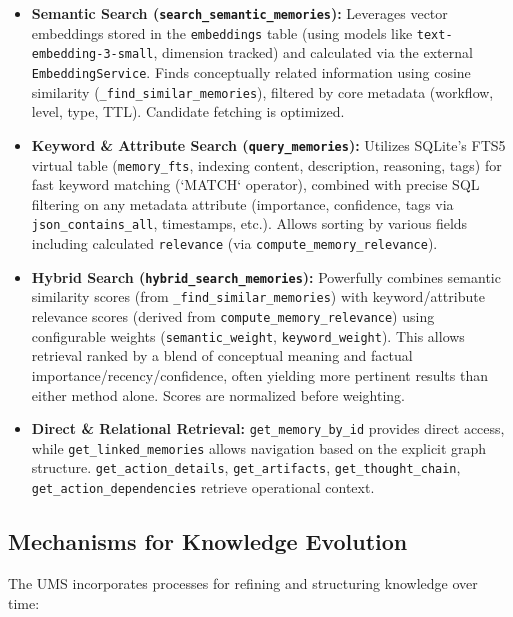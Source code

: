 \documentclass[12pt,a4paper]{article}
\newcommand{\code}[1]{\nolinkurl{#1}}
\begin{document}
\begin{itemize}
    \item \textbf{Semantic Search (\code{search\_semantic\_memories}):} Leverages vector embeddings stored in the \code{embeddings} table (using models like \code{text-embedding-3-small}, dimension tracked) and calculated via the external \code{EmbeddingService}. Finds conceptually related information using cosine similarity (\code{\_find\_similar\_memories}), filtered by core metadata (workflow, level, type, TTL). Candidate fetching is optimized.

    \item \textbf{Keyword \& Attribute Search (\code{query\_memories}):} Utilizes SQLite's FTS5 virtual table (\code{memory\_fts}, indexing content, description, reasoning, tags) for fast keyword matching (`MATCH` operator), combined with precise SQL filtering on any metadata attribute (importance, confidence, tags via \code{json\_contains\_all}, timestamps, etc.). Allows sorting by various fields including calculated \code{relevance} (via \code{compute\_memory\_relevance}).

    \item \textbf{Hybrid Search (\code{hybrid\_search\_memories}):} Powerfully combines semantic similarity scores (from \code{\_find\_similar\_memories}) with keyword/attribute relevance scores (derived from \code{compute\_memory\_relevance}) using configurable weights (\code{semantic\_weight}, \code{keyword\_weight}). This allows retrieval ranked by a blend of conceptual meaning and factual importance/recency/confidence, often yielding more pertinent results than either method alone. Scores are normalized before weighting.

    \item \textbf{Direct \& Relational Retrieval:} \code{get\_memory\_by\_id} provides direct access, while \code{get\_linked\_memories} allows navigation based on the explicit graph structure. \code{get\_action\_details}, \code{get\_artifacts}, \code{get\_thought\_chain}, \code{get\_action\_dependencies} retrieve operational context.
\end{itemize}

\subsection{Mechanisms for Knowledge Evolution}

The UMS incorporates processes for refining and structuring knowledge over time:
\end{document}
